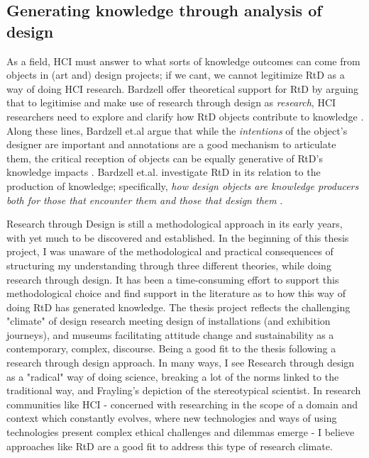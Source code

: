 \subsection{Generating knowledge through analysis of design}
As a field, HCI must answer to what sorts of knowledge outcomes can come from objects in (art and) design projects; if we cant, we cannot legitimize RtD as a way of doing HCI research. Bardzell offer theoretical support for RtD by arguing that to legitimise and make use of research through design as \emph{research}, HCI researchers need to explore and clarify how RtD objects contribute to knowledge \autocite[p.2093]{bardzell_immodest_2015}. Along these lines, Bardzell et.al argue that while the \emph{intentions} of the object's designer are important and annotations are a good mechanism to articulate them, the critical reception of objects can be equally generative of RtD's knowledge impacts \autocite[p. 2093]{bardzell_immodest_2015}. Bardzell et.al. investigate RtD in its relation to the production of knowledge; specifically, \emph{how design objects are knowledge producers both for those that encounter them and those that design them} \autocite[p. 2093]{bardzell_immodest_2015}. 

Research through Design is still a methodological approach in its early years, with yet much to be discovered and established. In the beginning of this thesis project, I was unaware of the methodological and practical consequences of structuring my understanding through three different theories, while doing research through design. It has been a time-consuming effort to support this methodological choice and find support in the literature as to how this way of doing RtD has generated knowledge. The thesis project reflects the challenging "climate" of design research meeting design of installations (and exhibition journeys), and museums facilitating attitude change and sustainability as a contemporary, complex, discourse. Being a good fit to the thesis following a research through design approach. In many ways, I see Research through design as a "radical" way of doing science, breaking a lot of the norms linked to the traditional way, and Frayling's depiction of the stereotypical scientist. In research communities like HCI - concerned with researching in the scope of a domain and context which constantly evolves, where new technologies and ways of using technologies present complex ethical challenges and dilemmas emerge - I believe approaches like RtD are a good fit to address this type of research climate.

